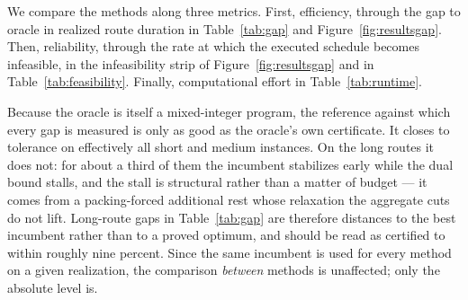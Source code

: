 We compare the methods along three metrics. First, efficiency, through the gap to oracle in realized route duration in Table~\ref{tab:gap} and Figure~\ref{fig:resultsgap}. Then, reliability, through the rate at which the executed schedule becomes infeasible, in the infeasibility strip of Figure~\ref{fig:resultsgap} and in Table~\ref{tab:feasibility}. Finally, computational effort in Table~\ref{tab:runtime}.

Because the oracle is itself a mixed-integer program, the reference against which every gap is measured is only as good as the oracle's own certificate. It closes to tolerance on effectively all short and medium instances. On the long routes it does not: for about a third of them the incumbent stabilizes early while the dual bound stalls, and the stall is structural rather than a matter of budget --- it comes from a packing-forced additional rest whose relaxation the aggregate cuts do not lift. Long-route gaps in Table~\ref{tab:gap} are therefore distances to the best incumbent rather than to a proved optimum, and should be read as certified to within roughly nine percent. Since the same incumbent is used for every method on a given realization, the comparison \emph{between} methods is unaffected; only the absolute level is.


